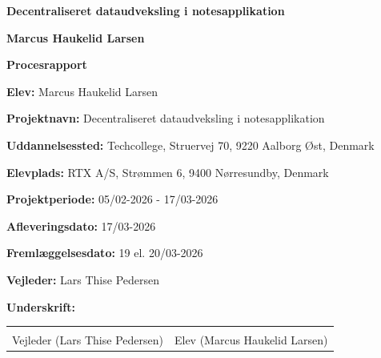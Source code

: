 \documentclass{article}
\newcommand{\projectname}{Decentraliseret dataudveksling i notesapplikation}
\newcommand{\student}{Marcus Haukelid Larsen}
\newcommand{\supervisor}{Lars Thise Pedersen}
\begin{document}

\begin{center}
  {\Huge \textbf{\projectname}}

  \vspace*{\fill}

  {\Large \textbf{\student}}

  \vspace*{\fill}

  {\large \textbf{Procesrapport}}
\end{center}

\thispagestyle{empty}

\newpage
\begin{center}  
  {\large \textbf{Elev:} \student}
  \vspace*{\fill}

  {\large \textbf{Projektnavn:} \projectname}
  \vspace*{\fill}

  {\large \textbf{Uddannelsessted:} Techcollege, Struervej 70, 9220 Aalborg Øst, Denmark}
  \vspace*{\fill}

  {\large \textbf{Elevplads:} RTX A/S, Strømmen 6, 9400 Nørresundby, Denmark}
  \vspace*{\fill}

  {\large \textbf{Projektperiode:} 05/02-2026 - 17/03-2026}
  \vspace*{\fill}

  {\large \textbf{Afleveringsdato:} 17/03-2026}
  \vspace*{\fill}

  {\large \textbf{Fremlæggelsesdato:} 19 el. 20/03-2026}
  \vspace*{\fill}

  {\large \textbf{Vejleder:} \supervisor}
  \vspace*{\fill}

  {\large \textbf{Underskrift:}}
  \vspace*{\fill}
  
  \begin{tabular}{p{6cm} p{6cm}}
    \hrulefill & \hrulefill \\
    Vejleder (\supervisor) & Elev (\student)
  \end{tabular}
\end{center}

\thispagestyle{empty}

\newpage
\tableofcontents

\newpage
\end{document}
